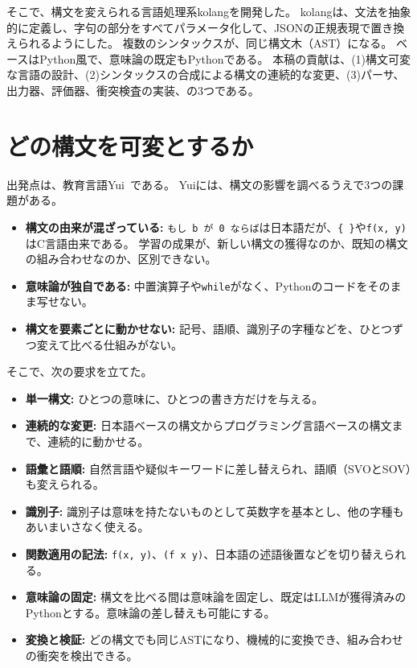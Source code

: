 \documentclass{ipsjprosym}
\begin{document}
そこで、構文を変えられる言語処理系kolangを開発した。
kolangは、文法を抽象的に定義し、字句の部分をすべてパラメータ化して、JSONの正規表現で置き換えられるようにした。
複数のシンタックスが、同じ構文木（AST）になる。
ベースはPython風で、意味論の既定もPythonである。
本稿の貢献は、(1)構文可変な言語の設計、(2)シンタックスの合成による構文の連続的な変更、(3)パーサ、出力器、評価器、衝突検査の実装、の3つである。

\section{どの構文を可変とするか}
\label{sec:requirements}

出発点は、教育言語Yui~\cite{Kuramitsu2026Nanako}である。
Yuiには、構文の影響を調べるうえで3つの課題がある。
\begin{itemize}
  \item \textbf{構文の由来が混ざっている:}
    \verb|もし b が 0 ならば|は日本語だが、\verb|{ }|や\verb|f(x, y)|はC言語由来である。
    学習の成果が、新しい構文の獲得なのか、既知の構文の組み合わせなのか、区別できない。
  \item \textbf{意味論が独自である:}
    中置演算子や\verb|while|がなく、Pythonのコードをそのまま写せない。
  \item \textbf{構文を要素ごとに動かせない:}
    記号、語順、識別子の字種などを、ひとつずつ変えて比べる仕組みがない。
\end{itemize}

そこで、次の要求を立てた。
\begin{itemize}
  \item \textbf{単一構文:} ひとつの意味に、ひとつの書き方だけを与える。
  \item \textbf{連続的な変更:} 日本語ベースの構文からプログラミング言語ベースの構文まで、連続的に動かせる。
  \item \textbf{語彙と語順:} 自然言語や疑似キーワードに差し替えられ、語順（SVOとSOV）も変えられる。
  \item \textbf{識別子:} 識別子は意味を持たないものとして英数字を基本とし、他の字種もあいまいさなく使える。
  \item \textbf{関数適用の記法:} \verb|f(x, y)|、\verb|(f x y)|、日本語の述語後置などを切り替えられる。
  \item \textbf{意味論の固定:} 構文を比べる間は意味論を固定し、既定はLLMが獲得済みのPythonとする。意味論の差し替えも可能にする。
  \item \textbf{変換と検証:} どの構文でも同じASTになり、機械的に変換でき、組み合わせの衝突を検出できる。
\end{itemize}
\end{document}
